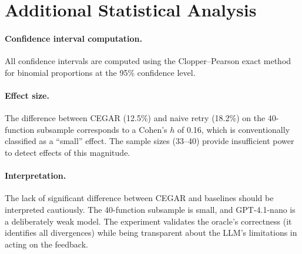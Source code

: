 \documentclass[10pt,letterpaper]{article}
\begin{document}
\section{Additional Statistical Analysis}
\label{app:stats}

\paragraph{Confidence interval computation.}
All confidence intervals are computed using the Clopper--Pearson exact method
for binomial proportions at the 95\% confidence level.

\paragraph{Effect size.}
The difference between CEGAR (12.5\%) and naive retry (18.2\%) on the
40-function subsample corresponds to a Cohen's $h$ of 0.16, which is
conventionally classified as a ``small'' effect. The sample sizes (33--40)
provide insufficient power to detect effects of this magnitude.

\paragraph{Interpretation.}
The lack of significant difference between CEGAR and baselines should be
interpreted cautiously. The 40-function subsample is small, and GPT-4.1-nano
is a deliberately weak model. The experiment validates the oracle's correctness
(it identifies all divergences) while being transparent about the LLM's
limitations in acting on the feedback.

\end{document}
